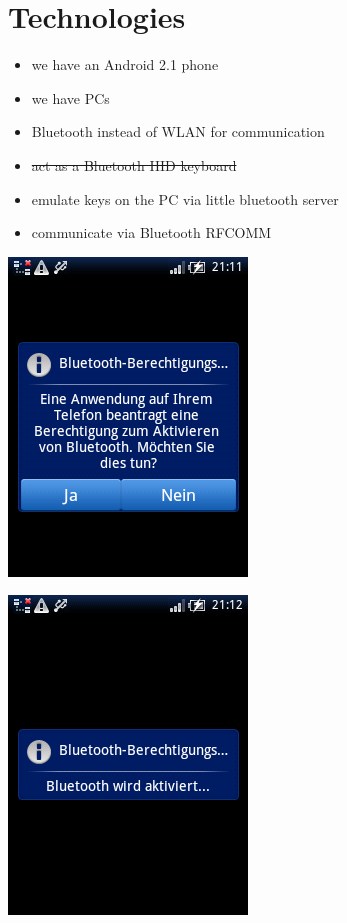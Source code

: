 \documentclass[ddc nogerman]{tudbeamer}
\begin{document}
\section{Technologies}
\begin{frame}
    \begin{itemize}
        \item we have an Android 2.1 phone
        \item we have PCs
        \item Bluetooth instead of WLAN for communication
        \item\sout{act as a Bluetooth HID keyboard}
        \item emulate keys on the PC via little bluetooth server
        \item communicate via Bluetooth RFCOMM
    \end{itemize}
\end{frame}

\begin{frame}
    \includegraphics[height=\textheight]{img/btauth.png}
\end{frame}

\begin{frame}
    \includegraphics[height=\textheight]{img/btactivate.png}
\end{frame}
\end{document}
